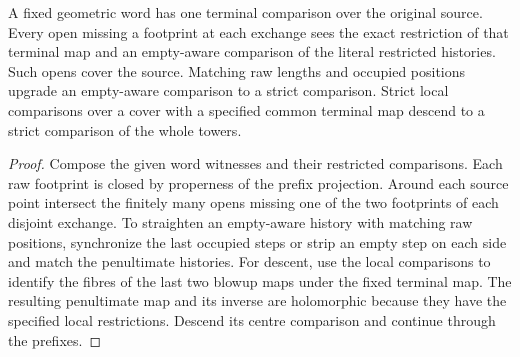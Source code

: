 \begin{proposition}
\label{hir:g8-local-compared-reordered-towers}
\leanok
A fixed geometric word has one terminal comparison over the original
source. Every open missing a footprint at each exchange sees the exact
restriction of that terminal map and an empty-aware comparison of
the literal restricted histories. Such opens cover the source.
Matching raw lengths and occupied positions upgrade an empty-aware
comparison to a strict comparison. Strict local comparisons over a
cover with a specified common terminal map descend to a strict
comparison of the whole towers.
\end{proposition}
\begin{proof}
Compose the given word witnesses and their restricted comparisons.
Each raw footprint is closed by properness of the prefix projection.
Around each source point intersect the finitely many opens missing one
of the two footprints of each disjoint exchange. To straighten an
empty-aware history with matching raw positions, synchronize the last
occupied steps or strip an empty step on each side and match the
penultimate histories. For descent, use the local comparisons to
identify the fibres of the last two blowup maps under the fixed
terminal map. The resulting penultimate map and its inverse are
holomorphic because they have the specified local restrictions.
Descend its centre comparison and continue through the prefixes.
\end{proof}

